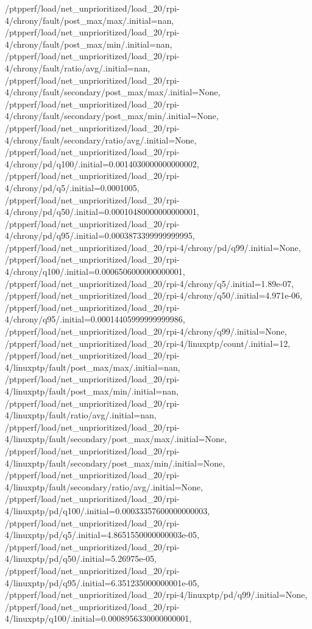 {    /ptpperf/load/net_unprioritized/load_20/rpi-4/chrony/fault/post_max/max/.initial=nan,
    /ptpperf/load/net_unprioritized/load_20/rpi-4/chrony/fault/post_max/min/.initial=nan,
    /ptpperf/load/net_unprioritized/load_20/rpi-4/chrony/fault/ratio/avg/.initial=nan,
    /ptpperf/load/net_unprioritized/load_20/rpi-4/chrony/fault/secondary/post_max/max/.initial=None,
    /ptpperf/load/net_unprioritized/load_20/rpi-4/chrony/fault/secondary/post_max/min/.initial=None,
    /ptpperf/load/net_unprioritized/load_20/rpi-4/chrony/fault/secondary/ratio/avg/.initial=None,
    /ptpperf/load/net_unprioritized/load_20/rpi-4/chrony/pd/q100/.initial=0.0014030000000000002,
    /ptpperf/load/net_unprioritized/load_20/rpi-4/chrony/pd/q5/.initial=0.0001005,
    /ptpperf/load/net_unprioritized/load_20/rpi-4/chrony/pd/q50/.initial=0.00010480000000000001,
    /ptpperf/load/net_unprioritized/load_20/rpi-4/chrony/pd/q95/.initial=0.0003873399999999995,
    /ptpperf/load/net_unprioritized/load_20/rpi-4/chrony/pd/q99/.initial=None,
    /ptpperf/load/net_unprioritized/load_20/rpi-4/chrony/q100/.initial=0.0006506000000000001,
    /ptpperf/load/net_unprioritized/load_20/rpi-4/chrony/q5/.initial=1.89e-07,
    /ptpperf/load/net_unprioritized/load_20/rpi-4/chrony/q50/.initial=4.971e-06,
    /ptpperf/load/net_unprioritized/load_20/rpi-4/chrony/q95/.initial=0.00014405999999999986,
    /ptpperf/load/net_unprioritized/load_20/rpi-4/chrony/q99/.initial=None,
    /ptpperf/load/net_unprioritized/load_20/rpi-4/linuxptp/count/.initial=12,
    /ptpperf/load/net_unprioritized/load_20/rpi-4/linuxptp/fault/post_max/max/.initial=nan,
    /ptpperf/load/net_unprioritized/load_20/rpi-4/linuxptp/fault/post_max/min/.initial=nan,
    /ptpperf/load/net_unprioritized/load_20/rpi-4/linuxptp/fault/ratio/avg/.initial=nan,
    /ptpperf/load/net_unprioritized/load_20/rpi-4/linuxptp/fault/secondary/post_max/max/.initial=None,
    /ptpperf/load/net_unprioritized/load_20/rpi-4/linuxptp/fault/secondary/post_max/min/.initial=None,
    /ptpperf/load/net_unprioritized/load_20/rpi-4/linuxptp/fault/secondary/ratio/avg/.initial=None,
    /ptpperf/load/net_unprioritized/load_20/rpi-4/linuxptp/pd/q100/.initial=0.00033357600000000003,
    /ptpperf/load/net_unprioritized/load_20/rpi-4/linuxptp/pd/q5/.initial=4.8651550000000003e-05,
    /ptpperf/load/net_unprioritized/load_20/rpi-4/linuxptp/pd/q50/.initial=5.26975e-05,
    /ptpperf/load/net_unprioritized/load_20/rpi-4/linuxptp/pd/q95/.initial=6.351235000000001e-05,
    /ptpperf/load/net_unprioritized/load_20/rpi-4/linuxptp/pd/q99/.initial=None,
    /ptpperf/load/net_unprioritized/load_20/rpi-4/linuxptp/q100/.initial=0.0008956330000000001,
}

